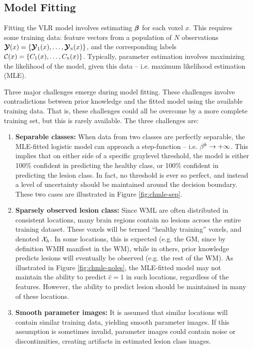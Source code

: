 \subsection{Model Fitting}\label{ss:modelfitting}
Fitting the VLR model involves estimating $\bm{\beta}$ for each voxel $x$.
This requires some training data: feature vectors from a population of $N$ observations $\bm{\mathcal{Y}}(x) = \{\bm{\mathcal{Y}}_1(x),\dots,\bm{\mathcal{Y}}_{\textsc{n}}(x)\}$, and the corresponding labels $\mathcal{C}(x) = \{C_1(x),\dots,C_{\textsc{n}}(x)\}$.
Typically, parameter estimation involves maximizing the likelihood of the model, given this data -- i.e. maximum likelihood estimation (MLE).
\par
Three major challenges emerge during model fitting.
These challenges involve contradictions between prior knowledge and the fitted model using the available training data.
That is, these challenges could all be overcome by a more complete training set, but this is rarely available.
The three challenges are:
\begin{enumerate}
  \item \label{chmle:separable} \textbf{Separable classes:} 
  When data from two classes are perfectly separable, the MLE-fitted logistic model can approach a step-function -- i.e. $\beta^k\rightarrow+\infty$.
This implies that on either side of a specific graylevel threshold, the model is either 100\% confident in predicting the healthy class, or 100\% confident in predicting the lesion class.
In fact, no threshold is ever so perfect, and instead a level of uncertainty should be maintained around the decision boundary.
These two cases are illustrated in Figure \ref{fig:chmle-sep}.
  \item \label{chmle:sparse} \textbf{Sparsely observed lesion class:} 
  Since WML are often distributed in consistent locations, many brain regions contain no lesions across the entire training dataset.
These voxels will be termed ``healthy training'' voxels, and denoted $\mathcal{X}_{h}$.
In some locations, this is expected (e.g. the GM, since by definition WMH manifest in the WM), while in others, prior knowledge predicts lesions will eventually be observed (e.g. the rest of the WM).
As illustrated in Figure \ref{fig:chmle-noles}, the MLE-fitted model may not maintain the ability to predict $\hat{c} = 1$ in such locations, regardless of the features.
However, the ability to predict lesion should be maintained in many of these locations.
  \item \label{chmle:noisy} \textbf{Smooth parameter images:} 
  It is assumed that similar locations will contain similar training data, yielding smooth parameter images.
If this assumption is sometimes invalid, parameter images could contain noise or discontinuities, creating artifacts in estimated lesion class images.
\end{enumerate}
